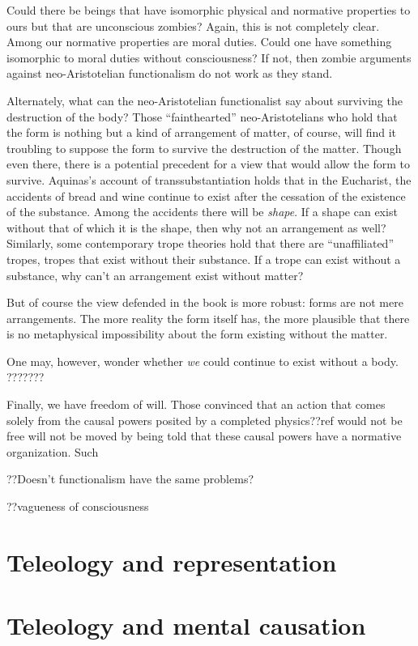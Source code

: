 Could there be beings that have isomorphic physical and normative properties to ours
but that are unconscious zombies? Again, this is not completely clear. Among our normative properties are moral duties. Could one
have something isomorphic to moral duties without consciousness? If not, then zombie arguments against neo-Aristotelian functionalism 
do not work as they stand. 

Alternately, what can the neo-Aristotelian functionalist say about surviving the destruction of the body? Those ``fainthearted'' 
neo-Aristotelians who hold that the form is nothing but a kind of arrangement of matter, of course, will find it troubling to
suppose the form to survive the destruction of the matter. Though even there, there is a potential precedent for a view
that would allow the form to survive. Aquinas's account of transsubstantiation holds that in the Eucharist, the accidents of
bread and wine continue to exist after the cessation of the existence of the substance. Among the accidents there will be 
\textit{shape}. If a shape can exist without that of which it is the shape, then why not an arrangement as well? Similarly,
some contemporary trope theories hold that there are ``unaffiliated'' tropes, tropes that exist without their substance. If a 
trope can exist without a substance, why can't an arrangement exist without matter? 

But of course the view defended in the book is more robust: forms are not mere arrangements. The more reality the form itself
has, the more plausible that there is no metaphysical impossibility about the form existing without the matter. 

One may, however, wonder whether \textit{we} could continue to exist without a body. ???????

Finally, we have freedom of will. Those convinced that an action that comes solely from the causal powers posited by a completed
physics??ref would not be free will not be moved by being told that these causal powers have a normative organization. Such 

??Doesn't functionalism have the same problems?

??vagueness of consciousness

\section{Teleology and representation}
\section{Teleology and mental causation}
